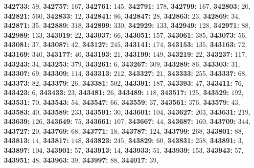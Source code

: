 \textsf{\bfseries 342733:} $59$, \textsf{\bfseries 342757:} $167$, \textsf{\bfseries 342761:} $145$, \textsf{\bfseries 342791:} $178$, \textsf{\bfseries 342799:} $167$, \textsf{\bfseries 342803:} $20$, \textsf{\bfseries 342821:} $560$, \textsf{\bfseries 342833:} $12$, \textsf{\bfseries 342841:} $86$, \textsf{\bfseries 342847:} $28$, \textsf{\bfseries 342863:} $23$, \textsf{\bfseries 342869:} $34$, \textsf{\bfseries 342871:} $35$, \textsf{\bfseries 342889:} $318$, \textsf{\bfseries 342899:} $330$, \textsf{\bfseries 342929:} $133$, \textsf{\bfseries 342949:} $128$, \textsf{\bfseries 342971:} $88$, \textsf{\bfseries 342989:} $133$, \textsf{\bfseries 343019:} $22$, \textsf{\bfseries 343037:} $66$, \textsf{\bfseries 343051:} $157$, \textsf{\bfseries 343061:} $385$, \textsf{\bfseries 343073:} $56$, \textsf{\bfseries 343081:} $37$, \textsf{\bfseries 343087:} $42$, \textsf{\bfseries 343127:} $245$, \textsf{\bfseries 343141:} $174$, \textsf{\bfseries 343153:} $135$, \textsf{\bfseries 343163:} $72$, \textsf{\bfseries 343169:} $340$, \textsf{\bfseries 343177:} $40$, \textsf{\bfseries 343193:} $21$, \textsf{\bfseries 343199:} $149$, \textsf{\bfseries 343219:} $22$, \textsf{\bfseries 343237:} $117$, \textsf{\bfseries 343243:} $34$, \textsf{\bfseries 343253:} $379$, \textsf{\bfseries 343261:} $6$, \textsf{\bfseries 343267:} $309$, \textsf{\bfseries 343289:} $86$, \textsf{\bfseries 343303:} $31$, \textsf{\bfseries 343307:} $69$, \textsf{\bfseries 343309:} $114$, \textsf{\bfseries 343313:} $212$, \textsf{\bfseries 343327:} $21$, \textsf{\bfseries 343333:} $255$, \textsf{\bfseries 343337:} $68$, \textsf{\bfseries 343373:} $82$, \textsf{\bfseries 343379:} $26$, \textsf{\bfseries 343381:} $502$, \textsf{\bfseries 343391:} $187$, \textsf{\bfseries 343393:} $47$, \textsf{\bfseries 343411:} $76$, \textsf{\bfseries 343423:} $6$, \textsf{\bfseries 343433:} $23$, \textsf{\bfseries 343481:} $26$, \textsf{\bfseries 343489:} $118$, \textsf{\bfseries 343517:} $125$, \textsf{\bfseries 343529:} $192$, \textsf{\bfseries 343531:} $70$, \textsf{\bfseries 343543:} $54$, \textsf{\bfseries 343547:} $66$, \textsf{\bfseries 343559:} $37$, \textsf{\bfseries 343561:} $376$, \textsf{\bfseries 343579:} $43$, \textsf{\bfseries 343583:} $40$, \textsf{\bfseries 343589:} $233$, \textsf{\bfseries 343591:} $30$, \textsf{\bfseries 343601:} $104$, \textsf{\bfseries 343627:} $203$, \textsf{\bfseries 343631:} $219$, \textsf{\bfseries 343639:} $126$, \textsf{\bfseries 343649:} $75$, \textsf{\bfseries 343661:} $107$, \textsf{\bfseries 343667:} $44$, \textsf{\bfseries 343687:} $160$, \textsf{\bfseries 343709:} $344$, \textsf{\bfseries 343727:} $20$, \textsf{\bfseries 343769:} $68$, \textsf{\bfseries 343771:} $18$, \textsf{\bfseries 343787:} $124$, \textsf{\bfseries 343799:} $268$, \textsf{\bfseries 343801:} $88$, \textsf{\bfseries 343813:} $14$, \textsf{\bfseries 343817:} $148$, \textsf{\bfseries 343823:} $245$, \textsf{\bfseries 343829:} $60$, \textsf{\bfseries 343831:} $258$, \textsf{\bfseries 343891:} $3$, \textsf{\bfseries 343897:} $104$, \textsf{\bfseries 343901:} $57$, \textsf{\bfseries 343913:} $14$, \textsf{\bfseries 343933:} $51$, \textsf{\bfseries 343939:} $153$, \textsf{\bfseries 343943:} $57$, \textsf{\bfseries 343951:} $48$, \textsf{\bfseries 343963:} $39$, \textsf{\bfseries 343997:} $88$, \textsf{\bfseries 344017:} $39$, 
